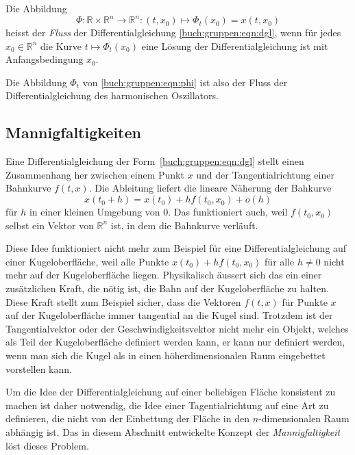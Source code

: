 \begin{definition}
Die Abbildung
\[
\Phi\colon \mathbb{R}\times\mathbb{R}^n\to\mathbb{R}^n
:
(t,x_0) \mapsto \Phi_t(x_0) = x(t,x_0)
\]
heisst der {\em Fluss} der Differentialgleichung
\eqref{buch:gruppen:eqn:dgl},
wenn für jedes $x_0\in\mathbb{R}^n$ die Kurve $t\mapsto \Phi_t(x_0)$
eine Lösung der Differentialgleichung ist mit Anfangsbedingung $x_0$.
\end{definition}

Die Abbildung $\Phi_t$ von \eqref{buch:gruppen:eqn:phi} ist also
der Fluss der Differentialgleichung des harmonischen Oszillators.

\subsection{Mannigfaltigkeiten
\label{buch:subsection:mannigfaltigkeit}}
Eine Differentialgleichung der Form~\eqref{buch:gruppen:eqn:dgl}
stellt einen Zusammenhang her zwischen einem Punkt $x$ und der
Tangentialrichtung einer Bahnkurve $f(t,x)$.
Die Ableitung liefert die lineare Näherung der Bahkurve
\[
x(t_0+h) = x(t_0) + h f(t_0,x_0) + o(h)
\]
für $h$ in einer kleinen Umgebung von $0$.
Das funktioniert auch, weil $f(t_0,x_0)$ selbst ein Vektor von
$\mathbb{R}^n$ ist, in dem die Bahnkurve verläuft.

Diese Idee funktioniert nicht mehr zum Beispiel für eine
Differentialgleichung auf einer Kugeloberfläche, weil alle Punkte
$x(t_0)+hf(t_0,x_0)$ für alle $h\ne 0$ nicht mehr auf der Kugeloberfläche
liegen.
Physikalisch äussert sich das ein einer zusätzlichen Kraft, die nötig
ist, die Bahn auf der Kugeloberfläche zu halten.
Diese Kraft stellt zum Beispiel sicher, dass die Vektoren $f(t,x)$ für
Punkte $x$ auf der Kugeloberfläche immer tangential an die Kugel sind.
Trotzdem ist der Tangentialvektor oder der Geschwindigkeitsvektor 
nicht mehr ein Objekt, welches als Teil der Kugeloberfläche definiert
werden kann, er kann nur definiert werden, wenn man sich die Kugel als
in einen höherdimensionalen Raum eingebettet vorstellen kann.

Um die Idee der Differentialgleichung auf einer beliebigen Fläche
konsistent zu machen ist daher notwendig, die Idee einer Tagentialrichtung
auf eine Art zu definieren, die nicht von der Einbettung der Fläche
in den $n$-dimensionalen Raum abhängig ist.
Das in diesem Abschnitt entwickelte Konzept der {\em Mannigfaltigkeit}
löst dieses Problem.

